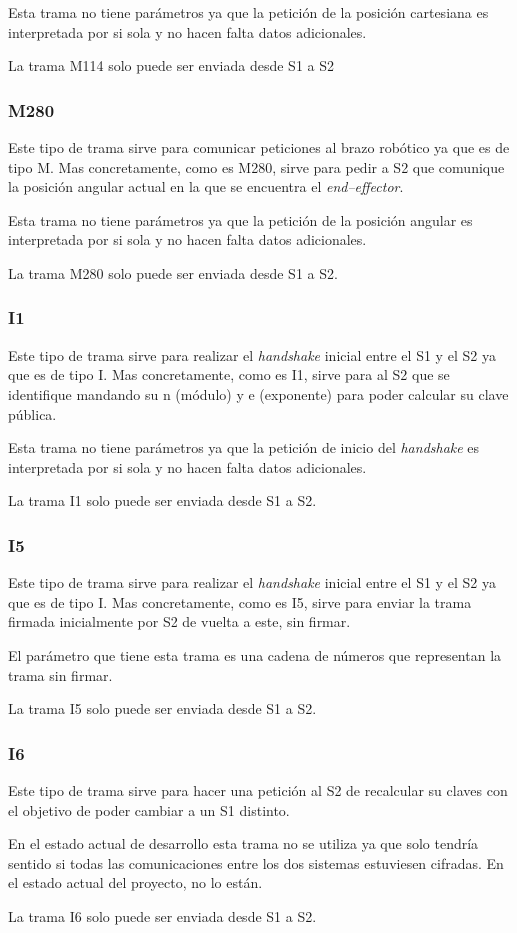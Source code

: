 Esta trama no tiene parámetros ya que la petición de la posición cartesiana es interpretada por si sola y no hacen falta datos adicionales.

La trama M114 solo puede ser enviada desde \ac{S1} a \ac{S2}

\subsubsection{M280}
Este tipo de trama sirve para comunicar peticiones al brazo robótico ya que es de tipo M. Mas concretamente, como es M280, sirve para pedir a \ac{S2} que comunique la posición angular
actual en la que se encuentra el \textit{end--effector}.

Esta trama no tiene parámetros ya que la petición de la posición angular es interpretada por si sola y no hacen falta datos adicionales.

La trama M280 solo puede ser enviada desde \ac{S1} a \ac{S2}.

\subsubsection{I1}
Este tipo de trama sirve para realizar el \textit{handshake} inicial entre el \ac{S1} y el \ac{S2} ya que es de tipo I. Mas concretamente, como es I1, sirve para al \ac{S2} que se identifique mandando su n (módulo) y e (exponente) para poder calcular su clave pública.

Esta trama no tiene parámetros ya que la petición de inicio del \textit{handshake} es interpretada por si sola y no hacen falta datos adicionales.

La trama I1 solo puede ser enviada desde \ac{S1} a \ac{S2}.

\subsubsection{I5}
Este tipo de trama sirve para realizar el \textit{handshake} inicial entre el \ac{S1} y el \ac{S2} ya que es de tipo I. Mas concretamente, como es I5, sirve para enviar la trama firmada inicialmente por \ac{S2} de vuelta a este, sin firmar. 

El parámetro que tiene esta trama es una cadena de números que representan la trama sin firmar.

La trama I5 solo puede ser enviada desde \ac{S1} a \ac{S2}.

\subsubsection{I6}
Este tipo de trama sirve para hacer una petición al \ac{S2} de recalcular su claves con el objetivo de poder cambiar a un \ac{S1} distinto.

En el estado actual de desarrollo esta trama no se utiliza ya que solo tendría sentido si todas las comunicaciones entre los dos sistemas estuviesen cifradas. En el estado actual del proyecto, no lo están.

La trama I6 solo puede ser enviada desde \ac{S1} a \ac{S2}.




